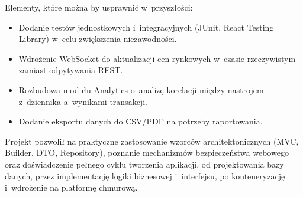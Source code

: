 \documentclass[12pt,a4paper]{article}
\begin{document}
Elementy, które można by usprawnić w~przyszłości:
\begin{itemize}
  \item Dodanie testów jednostkowych i~integracyjnych (JUnit, React Testing Library) w~celu zwiększenia niezawodności.
  \item Wdrożenie WebSocket do aktualizacji cen rynkowych w~czasie rzeczywistym zamiast odpytywania REST.
  \item Rozbudowa modułu Analytics o~analizę korelacji między nastrojem z~dziennika a~wynikami transakcji.
  \item Dodanie eksportu danych do CSV/PDF na potrzeby raportowania.
\end{itemize}

Projekt pozwolił na praktyczne zastosowanie wzorców architektonicznych (MVC, Builder, DTO, Repository), poznanie mechanizmów bezpieczeństwa webowego oraz doświadczenie pełnego cyklu tworzenia aplikacji, od projektowania bazy danych, przez implementację logiki biznesowej i~interfejsu, po konteneryzację i~wdrożenie na platformę chmurową.
\end{document}

